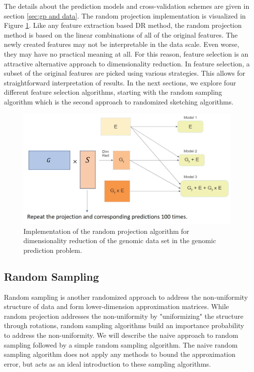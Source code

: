 The details about the prediction models and cross-validation schemes are given in section \ref{sec:gp and data}. The random projection implementation is visualized in Figure \ref{fig:rp_implement}. Like any feature extraction based DR method, the random projection method is based on the linear combinations of all of the original features. The newly created features may not be interpretable in the data scale. Even worse, they may have no practical meaning at all. For this reason, feature selection is an attractive alternative approach to dimensionality reduction. In feature selection, a subset of the original features are picked using various strategies. This allows for straightforward interpretation of results. In the next sections, we explore four different feature selection algorithms, starting with the random sampling algorithm which is the second approach to randomized sketching algorithms. \\

\begin{center}
\begin{figure}[!h]
\centering
\includegraphics[scale=0.4]{figures/rp_2_1.jpg}
\caption{Implementation of the random projection algorithm for dimensionality reduction of the genomic data set in the genomic prediction problem.}
\label{fig:rp_implement}
\end{figure}
\end{center}

\subsection{Random Sampling}

Random sampling is another randomized approach to address the non-uniformity structure of data and form lower-dimension approximation matrices. While random projection addresses the non-uniformity by "uniformizing" the structure through rotations, random sampling algorithms build an importance probability to address the non-uniformity. We will describe the naive approach to random sampling followed by a simple random sampling algorithm. The naive random sampling algorithm does not apply any methods to bound the approximation error, but acts as an ideal introduction to these sampling algorithms. \\

